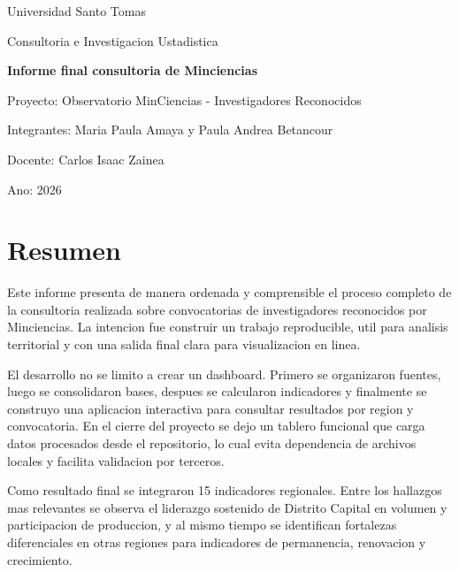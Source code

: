 \documentclass[12pt,letterpaper]{article}
\begin{document}
\begin{titlepage}
    \centering
    {\Large Universidad Santo Tomas\par}
    \vspace{0.4cm}
    {\large Consultoria e Investigacion Ustadistica\par}
    \vspace{1.7cm}
    {\LARGE \textbf{Informe final consultoria de Minciencias}\par}
    \vspace{1.0cm}
    {\large Proyecto: Observatorio MinCiencias - Investigadores Reconocidos\par}
    \vspace{0.9cm}
    {\large Integrantes: Maria Paula Amaya y Paula Andrea Betancour\par}
    \vspace{0.35cm}
    {\large Docente: Carlos Isaac Zainea\par}
    \vspace{0.35cm}
    {\large Ano: 2026\par}
    \vfill
\end{titlepage}

\tableofcontents
\newpage

\section{Resumen}

Este informe presenta de manera ordenada y comprensible el proceso completo de la consultoria realizada sobre convocatorias de investigadores reconocidos por Minciencias. La intencion fue construir un trabajo reproducible, util para analisis territorial y con una salida final clara para visualizacion en linea.

El desarrollo no se limito a crear un dashboard. Primero se organizaron fuentes, luego se consolidaron bases, despues se calcularon indicadores y finalmente se construyo una aplicacion interactiva para consultar resultados por region y convocatoria. En el cierre del proyecto se dejo un tablero funcional que carga datos procesados desde el repositorio, lo cual evita dependencia de archivos locales y facilita validacion por terceros.

Como resultado final se integraron 15 indicadores regionales. Entre los hallazgos mas relevantes se observa el liderazgo sostenido de Distrito Capital en volumen y participacion de produccion, y al mismo tiempo se identifican fortalezas diferenciales en otras regiones para indicadores de permanencia, renovacion y crecimiento.
\end{document}
